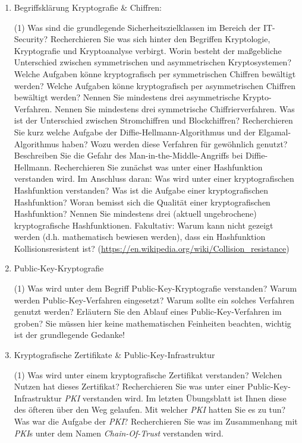 \documentclass[paper=a4,fontsize=11pt]{scrartcl}%
\begin{document}
\begin{enumerate}
	\item Begriffsklärung Kryptografie \& Chiffren:
	\begin{tasks}(1)
	\task Was sind die grundlegende Sicherheitszielklassen im Bereich der IT-Security?
	\task Recherchieren Sie was sich hinter den Begriffen Kryptologie, Kryptografie und Kryptoanalyse verbirgt.
	\task Worin besteht der maßgebliche Unterschied zwischen symmetrischen und asymmetrischen Kryptosystemen?
	\task Welche Aufgaben könne kryptografisch per symmetrischen Chiffren bewältigt werden?
	\task Welche Aufgaben könne kryptografisch per asymmetrischen Chiffren bewältigt werden?
	\task Nennen Sie mindestens drei asymmetrische Krypto-Verfahren.
	\task Nennen Sie mindestens drei symmetrische Chiffrierverfahren.
	\task Was ist der Unterschied zwischen Stromchiffren und Blockchiffren?
	\task Recherchieren Sie kurz welche Aufgabe der Diffie-Hellmann-Algorithmus und der Elgamal-Algorithmus haben? Wozu werden diese Verfahren für gewöhnlich genutzt?
	\task Beschreiben Sie die Gefahr des Man-in-the-Middle-Angriffs bei Diffie-Hellmann.
	\task Recherchieren Sie zunächst was unter einer Hashfunktion verstanden wird. Im Anschluss daran: Was wird unter einer kryptografischen Hashfunktion verstanden?
	\task Was ist die Aufgabe einer kryptografischen Hashfunktion?
	\task Woran bemisst sich die Qualität einer kryptografischen Hashfunktion?
	\task Nennen Sie mindestens drei (aktuell ungebrochene) kryptografische Hashfunktionen.
	\task Fakultativ: Warum kann nicht gezeigt werden (d.h. mathematisch bewiesen werden), dass ein Hashfunktion Kollisionsresistent ist? (\url{https://en.wikipedia.org/wiki/Collision_resistance})
	\end{tasks}
	\item Public-Key-Kryptografie
	\begin{tasks}(1)
		\task Was wird unter dem Begriff Public-Key-Kryptografie verstanden?
		\task Warum werden Public-Key-Verfahren eingesetzt? Warum sollte ein solches Verfahren genutzt werden?
		\task Erläutern Sie den Ablauf eines Public-Key-Verfahren im groben? Sie müssen hier keine mathematischen Feinheiten beachten, wichtig ist der grundlegende Gedanke!
	\end{tasks}
	\item Kryptografische Zertifikate \& Public-Key-Infrastruktur
	\begin{tasks}(1)
		\task Was wird unter einem kryptografische Zertifikat verstanden? Welchen Nutzen hat dieses Zertifikat?
		\task Recherchieren Sie was unter einer Public-Key-Infrastruktur \emph{PKI} verstanden wird.
		\task Im letzten Übungsblatt ist Ihnen diese des öfteren über den Weg gelaufen. Mit welcher \emph{PKI} hatten Sie es zu tun? Was war die Aufgabe der \emph{PKI}?
		\task Recherchieren Sie was im Zusammenhang mit \emph{PKI}s unter dem Namen \emph{Chain-Of-Trust} verstanden wird.
	\end{tasks}
\end{enumerate}
\end{document}
